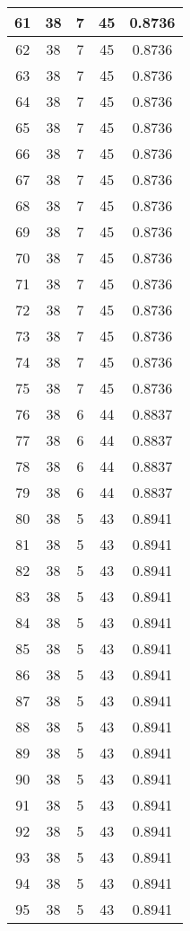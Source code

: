 \documentclass[letterpaper, 12pt]{article}
\begin{document}
\begin{longtable}{|c|c|c|c|c|}
\hline
61 & 38 & 7 & 45 & 0.8736 \\
\hline
62 & 38 & 7 & 45 & 0.8736 \\
\hline
63 & 38 & 7 & 45 & 0.8736 \\
\hline
64 & 38 & 7 & 45 & 0.8736 \\
\hline
65 & 38 & 7 & 45 & 0.8736 \\
\hline
66 & 38 & 7 & 45 & 0.8736 \\
\hline
67 & 38 & 7 & 45 & 0.8736 \\
\hline
68 & 38 & 7 & 45 & 0.8736 \\
\hline
69 & 38 & 7 & 45 & 0.8736 \\
\hline
70 & 38 & 7 & 45 & 0.8736 \\
\hline
71 & 38 & 7 & 45 & 0.8736 \\
\hline
72 & 38 & 7 & 45 & 0.8736 \\
\hline
73 & 38 & 7 & 45 & 0.8736 \\
\hline
74 & 38 & 7 & 45 & 0.8736 \\
\hline
75 & 38 & 7 & 45 & 0.8736 \\
\hline
76 & 38 & 6 & 44 & 0.8837 \\
\hline
77 & 38 & 6 & 44 & 0.8837 \\
\hline
78 & 38 & 6 & 44 & 0.8837 \\
\hline
79 & 38 & 6 & 44 & 0.8837 \\
\hline
80 & 38 & 5 & 43 & 0.8941 \\
\hline
81 & 38 & 5 & 43 & 0.8941 \\
\hline
82 & 38 & 5 & 43 & 0.8941 \\
\hline
83 & 38 & 5 & 43 & 0.8941 \\
\hline
84 & 38 & 5 & 43 & 0.8941 \\
\hline
85 & 38 & 5 & 43 & 0.8941 \\
\hline
86 & 38 & 5 & 43 & 0.8941 \\
\hline
87 & 38 & 5 & 43 & 0.8941 \\
\hline
88 & 38 & 5 & 43 & 0.8941 \\
\hline
89 & 38 & 5 & 43 & 0.8941 \\
\hline
90 & 38 & 5 & 43 & 0.8941 \\
\hline
91 & 38 & 5 & 43 & 0.8941 \\
\hline
92 & 38 & 5 & 43 & 0.8941 \\
\hline
93 & 38 & 5 & 43 & 0.8941 \\
\hline
94 & 38 & 5 & 43 & 0.8941 \\
\hline
95 & 38 & 5 & 43 & 0.8941 \\

\end{longtable}
\end{document}
